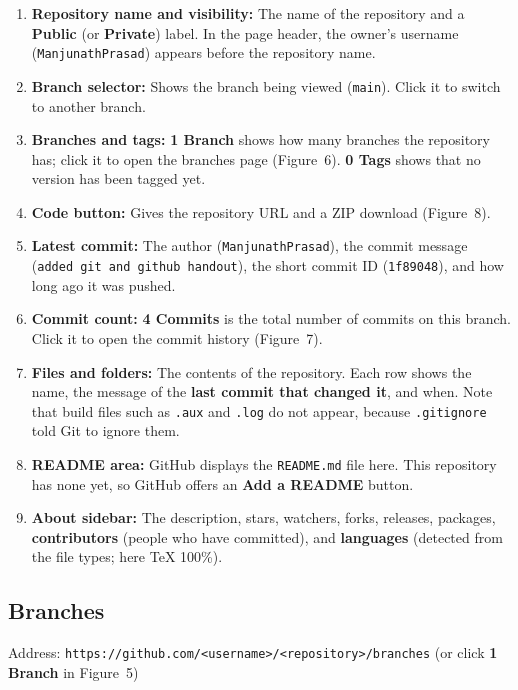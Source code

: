 \documentclass[11pt,a4paper]{article}
\newcommand{\code}[1]{\texttt{#1}}
\newcommand{\menu}[1]{\textsf{\textbf{#1}}}
\begin{document}
\begin{enumerate}
\item \textbf{Repository name and visibility:} The name of the repository and a \textbf{Public} (or \textbf{Private}) label. In the page header, the owner's username (\code{ManjunathPrasad}) appears before the repository name.
\item \textbf{Branch selector:} Shows the branch being viewed (\code{main}). Click it to switch to another branch.
\item \textbf{Branches and tags:} \textbf{1 Branch} shows how many branches the repository has; click it to open the branches page (Figure~6). \textbf{0 Tags} shows that no version has been tagged yet.
\item \textbf{Code button:} Gives the repository URL and a ZIP download (Figure~8).
\item \textbf{Latest commit:} The author (\code{ManjunathPrasad}), the commit message (\code{added git and github handout}), the short commit ID (\code{1f89048}), and how long ago it was pushed.
\item \textbf{Commit count:} \textbf{4 Commits} is the total number of commits on this branch. Click it to open the commit history (Figure~7).
\item \textbf{Files and folders:} The contents of the repository. Each row shows the name, the message of the \textbf{last commit that changed it}, and when. Note that build files such as \code{.aux} and \code{.log} do not appear, because \code{.gitignore} told Git to ignore them.
\item \textbf{README area:} GitHub displays the \code{README.md} file here. This repository has none yet, so GitHub offers an \menu{Add a README} button.
\item \textbf{About sidebar:} The description, stars, watchers, forks, releases, packages, \textbf{contributors} (people who have committed), and \textbf{languages} (detected from the file types; here TeX 100\%).
\end{enumerate}

\subsection{Branches}

Address: \code{https://github.com/<username>/<repository>/branches} (or click \textbf{1 Branch} in Figure~5)
\end{document}
